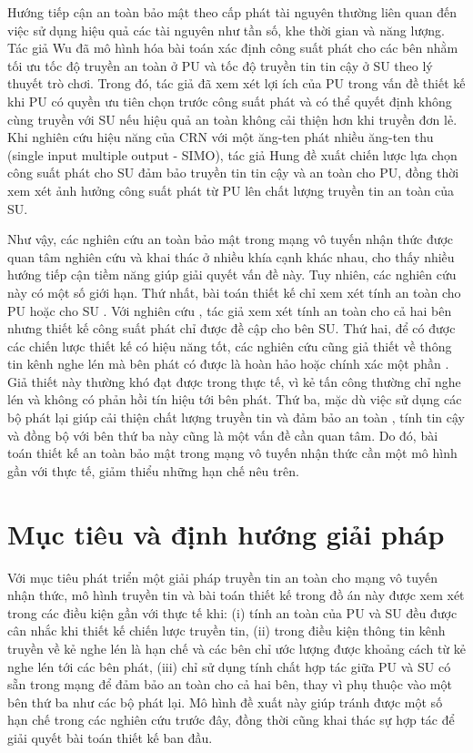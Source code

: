 \documentclass[../main.tex]{subfiles}
\begin{document}
Hướng tiếp cận an toàn bảo mật theo cấp phát tài nguyên thường liên quan đến việc sử dụng hiệu quả các tài nguyên như tần số, khe thời gian và năng lượng. Tác giả Wu \cite{wu2011information} đã mô hình hóa bài toán xác định công suất phát cho các bên nhằm tối ưu tốc độ truyền an toàn ở PU và tốc độ truyền tin tin cậy ở SU theo lý thuyết trò chơi. Trong đó, tác giả đã xem xét lợi ích của PU trong vấn đề thiết kế khi PU có quyền ưu tiên chọn trước công suất phát và có thể quyết định không cùng truyền với SU nếu hiệu quả an toàn không cải thiện hơn khi truyền đơn lẻ. Khi nghiên cứu hiệu năng của CRN với một ăng-ten phát nhiều ăng-ten thu (single input multiple output - SIMO), tác giả Hung \cite{tran2017cognitive} đề xuất chiến lược lựa chọn công suất phát cho SU đảm bảo truyền tin tin cậy và an toàn cho PU, đồng thời xem xét ảnh hưởng công suất phát từ PU lên chất lượng truyền tin an toàn của SU. 

Như vậy, các nghiên cứu an toàn bảo mật trong mạng vô tuyến nhận thức được quan tâm nghiên cứu và khai thác ở nhiều khía cạnh khác nhau, cho thấy nhiều hướng tiếp cận tiềm năng giúp giải quyết vấn đề này. Tuy nhiên, các nghiên cứu này có một số giới hạn. Thứ nhất, bài toán thiết kế chỉ xem xét tính an toàn cho PU hoặc cho SU \cite{bouabdellah2018secrecy,quach2017secrecy,houjeij2013game,kwon2012secure,wu2011information,zou2014secrecy,ouyang2017secrecy}. Với nghiên cứu \cite{tran2017cognitive}, tác giả xem xét tính an toàn cho cả hai bên nhưng thiết kế công suất phát chỉ được đề cập cho bên SU. Thứ hai, để có được các chiến lược thiết kế có hiệu năng tốt, các nghiên cứu cũng giả thiết về thông tin kênh nghe lén mà bên phát có được là hoàn hảo hoặc chính xác một phần  \cite{kwon2012secure,wu2011information,he2014secrecy}. Giả thiết này thường khó đạt được trong thực tế, vì kẻ tấn công thường chỉ nghe lén và không có phản hồi tín hiệu tới bên phát. Thứ ba, mặc dù việc sử dụng các bộ phát lại giúp cải thiện chất lượng truyền tin và đảm bảo an toàn \cite{bouabdellah2018secrecy,quach2017secrecy}, tính tin cậy và đồng bộ với bên thứ ba này cũng là một vấn đề cần quan tâm. Do đó, bài toán thiết kế an toàn bảo mật trong mạng vô tuyến nhận thức cần một mô hình gần với thực tế, giảm thiểu những hạn chế nêu trên.

\section{Mục tiêu và định hướng giải pháp}

Với mục tiêu phát triển một giải pháp truyền tin an toàn cho mạng vô tuyến nhận thức, mô hình truyền tin và bài toán thiết kế trong đồ án này được xem xét trong các điều kiện gần với thực tế khi: (i) tính an toàn của PU và SU đều được cân nhắc khi thiết kế chiến lược truyền tin, (ii) trong điều kiện thông tin kênh truyền về kẻ nghe lén là hạn chế và các bên chỉ ước lượng được khoảng cách từ kẻ nghe lén tới các bên phát, (iii) chỉ sử dụng tính chất hợp tác giữa PU và SU có sẵn trong mạng để đảm bảo an toàn cho cả hai bên, thay vì phụ thuộc vào một bên thứ ba như các bộ phát lại. Mô hình đề xuất này giúp tránh được một số hạn chế trong các nghiên cứu trước đây, đồng thời cũng khai thác sự hợp tác để giải quyết bài toán thiết kế ban đầu.
\end{document}
